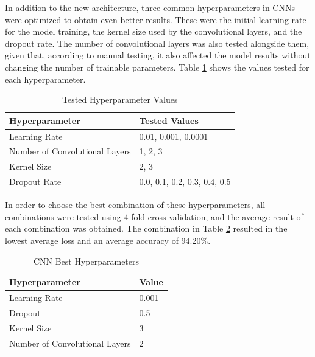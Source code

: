 In addition to the new architecture, three common hyperparameters in CNNs were optimized to obtain even better results. These were the initial learning rate for the model training, the kernel size used by the convolutional layers, and the dropout rate. The number of convolutional layers was also tested alongside them, given that, according to manual testing, it also affected the model results without changing the number of trainable parameters. Table \ref{table:cnn_hyperparameters} shows the values tested for each hyperparameter.

\begin{table}[H]
    \centering
    \caption{Tested Hyperparameter Values}
    \label{table:cnn_hyperparameters}
    \begin{tabular}{|l|l|}
        \hline
        Hyperparameter & Tested Values \\
        \hline
        Learning Rate & 0.01, 0.001, 0.0001 \\
        \hline
        Number of Convolutional Layers & 1, 2, 3 \\
        \hline
        Kernel Size & 2, 3 \\
        \hline
        Dropout Rate & 0.0, 0.1, 0.2, 0.3, 0.4, 0.5 \\
        \hline
    \end{tabular}
\end{table}

In order to choose the best combination of these hyperparameters, all combinations were tested using 4-fold cross-validation, and the average result of each combination was obtained. The combination in Table \ref{table:cnn_best_hyperparameters} resulted in the lowest average loss and an average accuracy of 94.20\%.

\begin{table}[H]
    \centering
    \caption{CNN Best Hyperparameters}
    \label{table:cnn_best_hyperparameters}
    \begin{tabular}{|l|l|}
        \hline
        Hyperparameter & Value \\
        \hline
        Learning Rate & 0.001 \\
        \hline
        Dropout & 0.5 \\
        \hline
        Kernel Size & 3 \\
        \hline
        Number of Convolutional Layers & 2 \\
        \hline
    \end{tabular}
\end{table}

